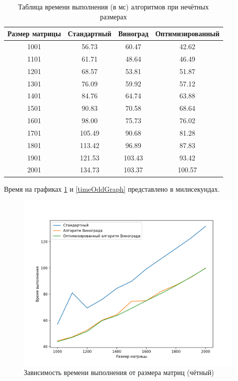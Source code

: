 \documentclass[12pt]{report}
\begin{document}
\begin{table} [h!]
	\caption{Таблица времени выполнения (в мс) алгоритмов при нечётных размерах}
	\begin{center}
	\begin{tabular}{|c c c c|} 
		\hline
		Размер матрицы & Стандартный & Виноград & Оптимизированный \\  
		\hline
        1001 & 56.73 & 60.47 & 42.62  \\ 
        \hline
        1101 & 61.71 & 48.64 & 46.49  \\ 
        \hline
        1201 & 68.57 & 53.81 & 51.87  \\ 
        \hline
        1301 & 76.09 & 59.92 & 57.12  \\ 
        \hline
        1401 & 84.76 & 64.74 & 63.88  \\ 
        \hline
        1501 & 90.83 & 70.58 & 68.64  \\ 
        \hline
        1601 & 98.00 & 75.73 & 76.02  \\ 
        \hline
        1701 & 105.49 & 90.68 & 81.28  \\ 
        \hline
        1801 & 113.42 & 96.89 & 87.83  \\ 
        \hline
        1901 & 121.53 & 103.43 & 93.42  \\ 
        \hline
        2001 & 134.73 & 103.37 & 100.57  \\ 
        \hline
	\end{tabular}
	\label{timeOddTable}
\end{center}
\end{table}
\newpage
Время на графиках \ref{timeEvenGraph} и  \ref{timeOddGraph} представлено в милисекундах. 
\newpage
\begin{figure}[h!p]
	\centering
	\includegraphics[scale = 0.6]{even.png}
	\caption{Зависимость времени выполнения от размера матриц (чётный)}
	\label{timeEvenGraph}
\end{figure}
\end{document}
